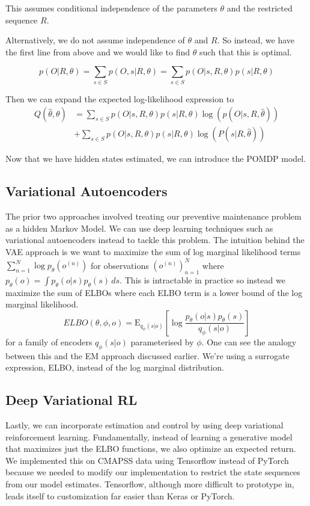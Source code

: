 \documentclass[english]{article}
\numberwithin{equation}{section}
\newcommand{\E}{\mathrm{E}}
\begin{document}
	This assumes conditional independence of the parameters $\theta$ and the restricted sequence $R$.
	
	Alternatively, we do not assume independence of $\theta$ and $R$. So instead, we have the first line from above and we would like to find $\theta$ such that this is optimal.
	
	$$p(O|R,\theta) = \sum_{s\in S} p(O,s|R,\theta) = \sum_{s\in S} p(O|s,R,\theta) p(s|R,\theta)$$
	
	Then we can expand the expected log-likelihood expression to
	\begin{align*}
	Q(\hat{\theta},\theta) &= \sum_{s\in S} p(O|s,R,\theta)p(s|R,\theta) \log(p(O|s,R,\hat{\theta})) \\
	&+ \sum_{s\in S} p(O|s,R,\theta)p(s|R,\theta) \log (P(s|R,\hat{\theta}))
	\end{align*}
	
	Now that we have hidden states estimated, we can introduce the POMDP model.
	
	\subsection*{Variational Autoencoders}
	The prior two approaches involved treating our preventive maintenance problem as a hidden Markov Model. We can use deep learning techniques such as variational autoencoders instead to tackle this problem. The intuition behind the VAE approach is we want to maximize the sum of log marginal likelihood terms $\sum_{n=1}^N \log p_{\theta}(o^{(n)})$ for observations $(o^{(n)})_{n=1}^N$ where $p_{\theta}(o)=\int p_{\theta}(o|s)p_{\theta}(s)\,ds.$ This is intractable in practice so instead we maximize the sum of ELBOs where each ELBO term is a lower bound of the log marginal likelihood.
	$$ELBO(\theta,\phi,o)=\E_{q_{\phi}(s|o)}[\log \frac{p_{\theta}(o|s)p_{\theta}(s)}{q_{\phi}(s|o)}]$$ for a family of encoders $q_{\phi}(s|o)$ parameterised by $\phi$. One can see the analogy between this and the EM approach discussed earlier. We're using a surrogate expression, ELBO, instead of the log marginal distribution.
	
	\subsection*{Deep Variational RL}
	Lastly, we can incorporate estimation and control by using deep variational reinforcement learning. Fundamentally, instead of learning a generative model that maximizes just the ELBO functions, we also optimize an expected return. We implemented this on CMAPSS data using Tensorflow instead of PyTorch because we needed to modify our implementation to restrict the state sequences from our model estimates. Tensorflow, although more difficult to prototype in, leads itself to customization far easier than Keras or PyTorch.
	 
\end{document}
